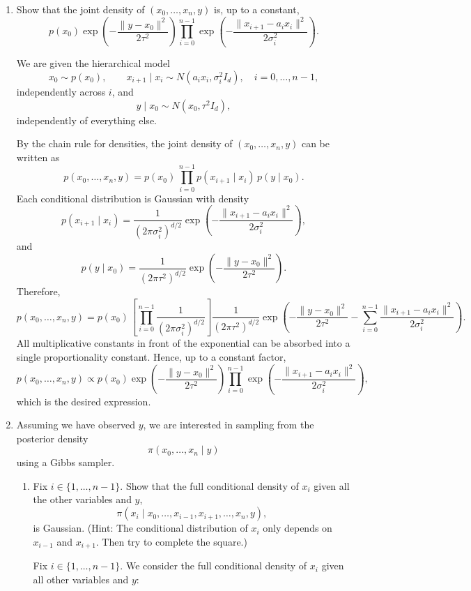 \documentclass[answers,12pt,addpoints]{exam}
\begin{document}
\begin{enumerate}
\item Show that the joint density of $(x_0, \ldots, x_n, y)$ is, up to a constant,
\[
p(x_0)
\exp\!\left(
-\frac{\|y - x_0\|^2}{2\tau^2}
\right)
\prod_{i=0}^{n-1}
\exp\!\left(
-\frac{\|x_{i+1} - a_i x_i\|^2}{2\sigma_i^2}
\right).
\]
\begin{solution}
We are given the hierarchical model
\[
x_0 \sim p(x_0), \qquad
x_{i+1} \mid x_i \sim N(a_i x_i,\sigma_i^2 I_d), \quad i=0,\dots,n-1,
\]
independently across $i$, and
\[
y \mid x_0 \sim N(x_0,\tau^2 I_d),
\]
independently of everything else.

By the chain rule for densities, the joint density of $(x_0,\ldots,x_n,y)$ can be written as
\[
p(x_0,\ldots,x_n,y)
= p(x_0)\,\prod_{i=0}^{n-1} p(x_{i+1} \mid x_i)\,p(y \mid x_0).
\]
Each conditional distribution is Gaussian with density
\[
p(x_{i+1} \mid x_i)
= \frac{1}{(2\pi\sigma_i^2)^{d/2}}
\exp\!\left(
-\frac{\|x_{i+1} - a_i x_i\|^2}{2\sigma_i^2}
\right),
\]
and
\[
p(y \mid x_0)
= \frac{1}{(2\pi\tau^2)^{d/2}}
\exp\!\left(
-\frac{\|y - x_0\|^2}{2\tau^2}
\right).
\]
Therefore,
\[
p(x_0,\ldots,x_n,y)
= p(x_0)\,
\left[
\prod_{i=0}^{n-1}
\frac{1}{(2\pi\sigma_i^2)^{d/2}}
\right]
\frac{1}{(2\pi\tau^2)^{d/2}}
\exp\!\left(
-\frac{\|y - x_0\|^2}{2\tau^2}
- \sum_{i=0}^{n-1} \frac{\|x_{i+1} - a_i x_i\|^2}{2\sigma_i^2}
\right).
\]
All multiplicative constants in front of the exponential can be absorbed into a single proportionality
constant. Hence, up to a constant factor,
\[
p(x_0,\ldots,x_n,y)
\propto
p(x_0)
\exp\!\left(
-\frac{\|y - x_0\|^2}{2\tau^2}
\right)
\prod_{i=0}^{n-1}
\exp\!\left(
-\frac{\|x_{i+1} - a_i x_i\|^2}{2\sigma_i^2}
\right),
\]
which is the desired expression.
\end{solution}
\item Assuming we have observed $y$, we are interested in sampling from the posterior density
\[
\pi(x_0, \ldots, x_n \mid y)
\]
using a Gibbs sampler.
\begin{enumerate}
\item Fix $i \in \{1, \ldots, n-1\}$. Show that the full conditional density of $x_i$ given all the other variables and $y$,
\[
\pi(x_i \mid x_0, \ldots, x_{i-1}, x_{i+1}, \ldots, x_n, y),
\]
is Gaussian. (Hint: The conditional distribution of $x_i$ only depends on $x_{i-1}$ and $x_{i+1}$. Then try to complete the square.)
\begin{solution}
Fix $i \in \{1,\dots,n-1\}$. We consider the full conditional density of $x_i$
given all other variables and $y$:

\end{solution}
\end{enumerate}
\end{enumerate}
\end{document}
